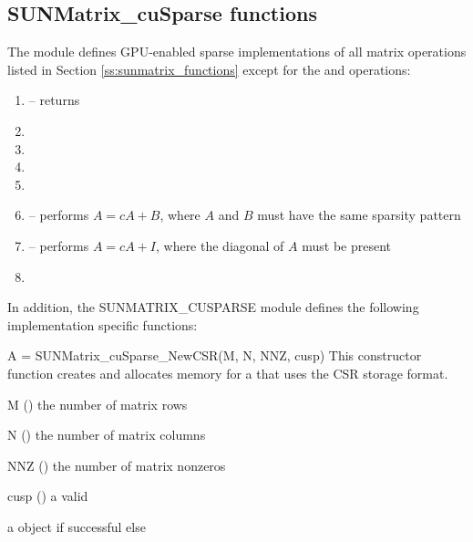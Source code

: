 \subsection{SUNMatrix\_cuSparse functions}
\label{ss:sunmat_cusparse_functions}

The  module defines GPU-enabled sparse implementations
of all matrix operations listed in Section
\ref{ss:sunmatrix_functions} except for the 
and  operations:

\begin{enumerate}
  \item {} -- returns 
  \item {}
  \item {}
  \item {}
  \item {}
  \item {} -- performs $A = cA + B$, where $A$ and $B$
    must have the same sparsity pattern
  \item {} -- performs $A = cA + I$, where the diagonal
    of $A$ must be present
  \item {}
\end{enumerate}


In addition, the SUNMATRIX\_CUSPARSE module defines the following implementation specific
functions:

{
  A = SUNMatrix\_cuSparse\_NewCSR(M, N, NNZ, cusp)
}
{
  This constructor function creates and allocates memory for a 
   that uses the CSR storage format.
}
{
  \begin{args}
  \item[M] () the number of matrix rows
  \item[N] () the number of matrix columns
  \item[NNZ] () the number of matrix nonzeros
  \item[cusp] () a valid 
  \end{args}
}
{
  a  object if successful else 
}
{}

